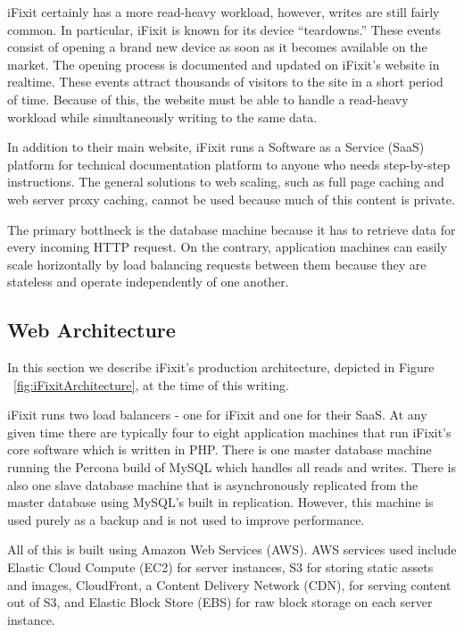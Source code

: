\documentclass[12pt]{ucthesis}
\begin{document}
iFixit certainly has a more read-heavy workload, however, writes are still fairly common.
In particular, iFixit is known for its device ``teardowns.''
These events consist of opening a brand new device as soon as it becomes available on the market.
The opening process is documented and updated on iFixit's website in realtime.
These events attract thousands of visitors to the site in a short period of time.
Because of this, the website must be able to handle a read-heavy workload while simultaneously writing to the same data.

In addition to their main website, iFixit runs a Software as a Service (SaaS) platform for technical documentation platform to anyone who needs step-by-step instructions.
The general solutions to web scaling, such as full page caching and web server proxy caching, cannot be used because much of this content is private.

The primary bottlneck is the database machine because it has to retrieve data for every incoming HTTP request.
On the contrary, application machines can easily scale horizontally by load balancing requests between them because they are stateless and operate independently of one another.

\subsection{Web Architecture}
In this section we describe iFixit's production architecture, depicted in Figure ~\ref{fig:iFixitArchitecture}, at the time of this writing.

iFixit runs two load balancers - one for iFixit and one for their SaaS.
At any given time there are typically four to eight application machines that run iFixit's core software which is written in PHP.
There is one master database machine running the Percona build of MySQL which handles all reads and writes.
There is also one slave database machine that is asynchronously replicated from the master database using MySQL's built in replication.
However, this machine is used purely as a backup and is not used to improve performance.

All of this is built using Amazon Web Services (AWS).
AWS services used include Elastic Cloud Compute (EC2) for server instances, S3 for storing static assets and images, CloudFront, a Content Delivery Network (CDN), for serving content out of S3, and Elastic Block Store (EBS) for raw block storage on each server instance.
\end{document}
